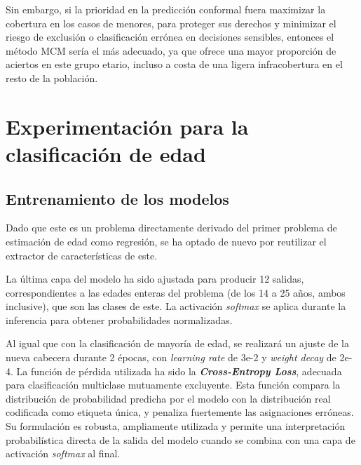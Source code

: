 Sin embargo, si la prioridad en la predicción conformal fuera maximizar la cobertura en los casos de menores, para proteger sus derechos y minimizar el riesgo de exclusión o clasificación errónea en decisiones sensibles, entonces el método MCM sería el más adecuado, ya que ofrece una mayor proporción de aciertos en este grupo etario, incluso a costa de una ligera infracobertura en el resto de la población.


\FloatBarrier



\section{Experimentación para la clasificación de edad}


\subsection{Entrenamiento de los modelos}

Dado que este es un problema directamente derivado del primer problema de estimación de edad como regresión, se ha optado de nuevo por reutilizar el extractor de características de este. 

La última capa del modelo ha sido ajustada para producir 12 salidas, correspondientes a las edades enteras del problema (de los 14 a 25 años, ambos inclusive), que son las clases de este. La activación \textit{softmax} se aplica durante la inferencia para obtener probabilidades normalizadas.

Al igual que con la clasificación de mayoría de edad, se realizará un ajuste de la nueva cabecera durante 2 épocas, con \textit{learning rate} de 3e-2 y \textit{weight decay} de 2e-4. La función de pérdida utilizada ha sido la \textbf{\textit{Cross-Entropy Loss}}, adecuada para clasificación multiclase mutuamente excluyente. Esta función compara la distribución de probabilidad predicha por el modelo con la distribución real codificada como etiqueta única, y penaliza fuertemente las asignaciones erróneas. Su formulación es robusta, ampliamente utilizada y permite una interpretación probabilística directa de la salida del modelo cuando se combina con una capa de activación \textit{softmax} al final.

